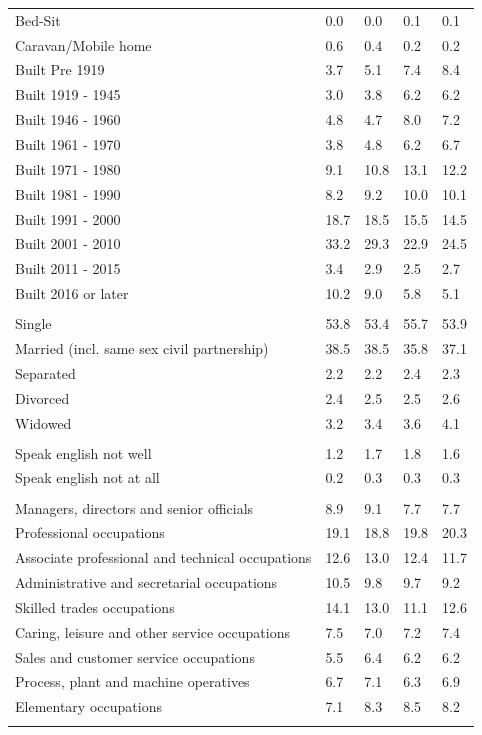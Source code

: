 \documentclass{article}
\begin{document}
\begin{table}[h]
\begin{tabular}{KTTTT}
Bed-Sit & 0.0& 0.0& 0.1& 0.1\\
Caravan/Mobile home & 0.6& 0.4& 0.2& 0.2\\
    \hline
Built Pre 1919 & 3.7& 5.1& 7.4& 8.4\\
Built 1919 - 1945 & 3.0& 3.8& 6.2& 6.2\\
Built  1946 - 1960 & 4.8& 4.7& 8.0& 7.2\\
Built  1961 - 1970 & 3.8& 4.8& 6.2& 6.7\\
Built  1971 - 1980 &  9.1& 10.8& 13.1& 12.2\\
Built  1981 - 1990 &  8.2&  9.2& 10.0& 10.1\\
Built  1991 - 2000 & 18.7& 18.5& 15.5& 14.5\\
Built  2001 - 2010 & 33.2& 29.3& 22.9& 24.5\\
Built  2011 - 2015 & 3.4& 2.9& 2.5& 2.7\\
Built  2016 or later & 10.2&  9.0&  5.8&  5.1\\
\hline
    \\
    \hline
Single & 53.8& 53.4& 55.7& 53.9\\
Married (incl. same sex civil partnership) & 38.5& 38.5& 35.8& 37.1\\
Separated  & 2.2& 2.2& 2.4& 2.3\\
Divorced  & 2.4& 2.5& 2.5& 2.6\\
Widowed & 3.2& 3.4& 3.6& 4.1\\
\hline
    \\ 
    \hline
Speak english not well & 1.2& 1.7& 1.8& 1.6\\
Speak english not at all & 0.2& 0.3& 0.3& 0.3\\
\hline
    \\
    \hline
Managers, directors and senior officials & 8.9& 9.1& 7.7& 7.7\\
Professional occupations & 19.1& 18.8& 19.8& 20.3\\
Associate professional and technical occupations & 12.6& 13.0& 12.4& 11.7\\
Administrative and secretarial occupations & 10.5&  9.8&  9.7&  9.2\\
Skilled trades occupations & 14.1& 13.0& 11.1& 12.6\\
Caring, leisure and other service occupations & 7.5& 7.0& 7.2& 7.4\\
Sales and customer service occupations & 5.5& 6.4& 6.2& 6.2\\
Process, plant and machine operatives & 6.7& 7.1& 6.3& 6.9\\
Elementary occupations & 7.1& 8.3& 8.5& 8.2\\
\hline
\end{tabular}
\end{table}
\end{document}
